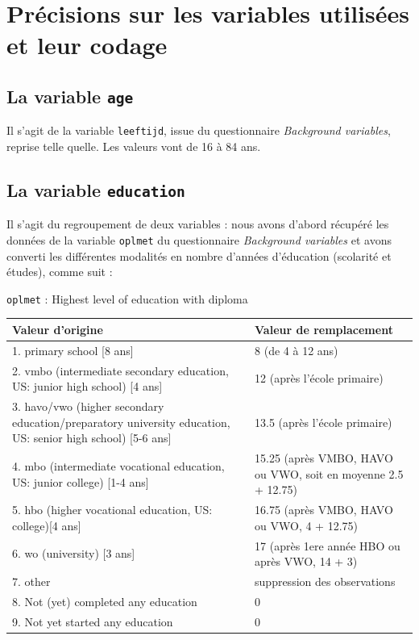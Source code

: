 \documentclass[a4paper, french, 11 pt]{article}\usepackage[]{graphicx}\usepackage[]{xcolor}
\begin{document}
\printbibliography

\appendix
\appendixpage
\addappheadtotoc

\section{Précisions sur les variables utilisées et leur codage}

\subsection{La variable \texttt{age}}

Il s’agit de la variable \texttt{leeftijd}, issue du questionnaire \textit{Background variables}, reprise telle quelle. Les valeurs vont de 16 à 84 ans. 

\subsection{La variable \texttt{education}}

Il s'agit du regroupement de deux variables : nous avons d'abord récupéré les données de la variable \texttt{oplmet} du questionnaire \textit{Background variables} et avons converti les différentes modalités en nombre d'années d'éducation (scolarité et études), comme suit : 

\vspace{0,5cm}
\begin{minipage}{0,8\linewidth}
{\footnotesize\texttt{oplmet} : Highest level of education with diploma
\vspace{0,2cm}

\begin{tabular}{m{0,5\linewidth}m{0,5\linewidth}}
\hline
Valeur d'origine & Valeur de remplacement \\
\hline
1. primary school [8 ans] & 8 (de 4 à 12 ans) \\
2. vmbo (intermediate secondary education, US: junior high school) [4 ans] & 12 (après l'école primaire) \\
3. havo/vwo (higher secondary education/preparatory university education, US: senior high school) [5-6 ans] & 13.5 (après l'école primaire) \\
4. mbo (intermediate vocational education, US: junior college) [1-4 ans] & 15.25 (après VMBO, HAVO ou VWO, soit en moyenne 2.5 + 12.75)\\
5. hbo (higher vocational education, US: college)[4 ans] & 16.75 (après VMBO, HAVO ou VWO, 4 + 12.75)\\
6. wo (university) [3 ans]& 17 (après 1ere année HBO ou après VWO, 14 + 3)\\
7. other & suppression des observations \\
8. Not (yet) completed any education & 0 \\
9. Not yet started any education & 0 \\
\hline
\end{tabular}}
\end{minipage}
\vspace{0,3cm}
\end{document}
